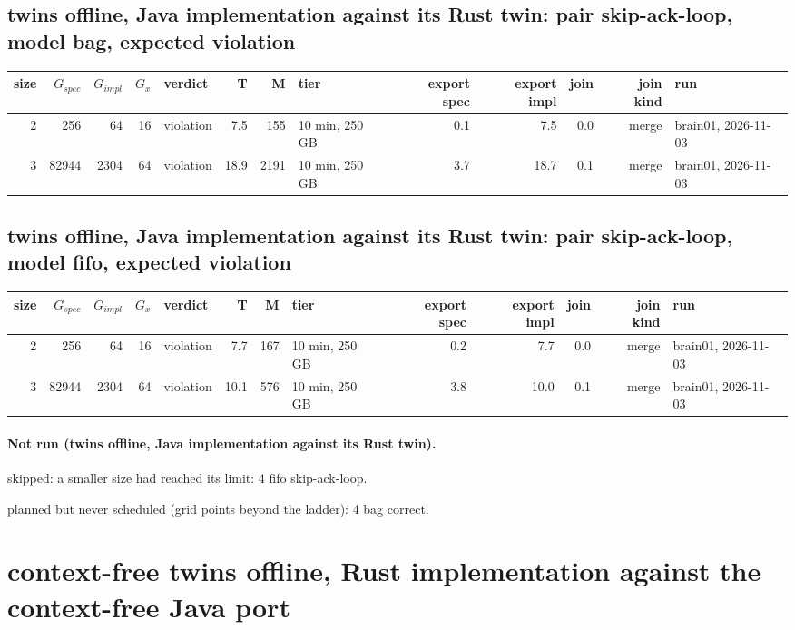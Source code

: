 \documentclass[10pt]{article}
\begin{document}
\subsection*{twins offline, Java implementation against its Rust twin: pair \textsf{skip-ack-loop}, model bag, expected violation}
\begin{longtable}{@{}rrrrlrrlrrrrl@{}}
\toprule
size & $G_{\mathit{spec}}$ & $G_{\mathit{impl}}$ & $G_x$ & verdict & T & M & tier & export spec & export impl & join & join kind & run \\
\midrule
\endhead
\color{blue} 2 & 256 & 64 & 16 & violation & 7.5 & 155 & 10 min, 250 GB & 0.1 & 7.5 & 0.0 & merge & brain01, 2026-11-03 \\
\color{blue} 3 & 82944 & 2304 & 64 & violation & 18.9 & 2191 & 10 min, 250 GB & 3.7 & 18.7 & 0.1 & merge & brain01, 2026-11-03 \\
\bottomrule
\end{longtable}
\subsection*{twins offline, Java implementation against its Rust twin: pair \textsf{skip-ack-loop}, model fifo, expected violation}
\begin{longtable}{@{}rrrrlrrlrrrrl@{}}
\toprule
size & $G_{\mathit{spec}}$ & $G_{\mathit{impl}}$ & $G_x$ & verdict & T & M & tier & export spec & export impl & join & join kind & run \\
\midrule
\endhead
\color{blue} 2 & 256 & 64 & 16 & violation & 7.7 & 167 & 10 min, 250 GB & 0.2 & 7.7 & 0.0 & merge & brain01, 2026-11-03 \\
\color{blue} 3 & 82944 & 2304 & 64 & violation & 10.1 & 576 & 10 min, 250 GB & 3.8 & 10.0 & 0.1 & merge & brain01, 2026-11-03 \\
\bottomrule
\end{longtable}
\paragraph{Not run (twins offline, Java implementation against its Rust twin).}
skipped: a smaller size had reached its limit: 4 fifo skip-ack-loop.\par
planned but never scheduled (grid points beyond the ladder): 4 bag correct.\par
\section*{context-free twins offline, Rust implementation against the context-free Java port}
\end{document}
